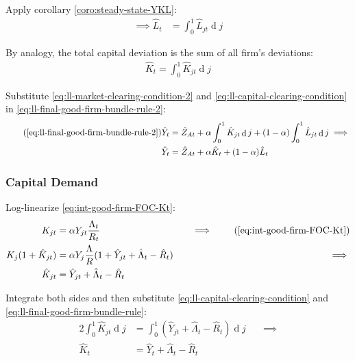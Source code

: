 \documentclass[
	12pt, 
	]{article}
\numberwithin{equation}{section}
\DeclareMathOperator{\dif}{d}
\theoremstyle{definition}
\theoremstyle{plain}
\theoremstyle{plain}
\theoremstyle{plain}
\begin{document}
Apply corollary \ref{coro:steady-state-YKL}:
\begin{align}
	\implies \hat{L}_t &= \int_{0}^{1} \hat{L}_{jt} \dif j \label{eq:ll-market-clearing-condition-2}
\end{align}

By analogy, the total capital deviation is the sum of all firm's deviations:
\begin{align}
	\hat{K}_t = \int_{0}^{1} \hat{K}_{jt} \dif j \label{eq:ll-capital-clearing-condition}
\end{align}

Substitute \ref{eq:ll-market-clearing-condition-2} and \ref{eq:ll-capital-clearing-condition} in \ref{eq:ll-final-good-firm-bundle-rule-2}:
\begin{align}
\tag{\ref{eq:ll-final-good-firm-bundle-rule-2}}
	\hat{Y}_t &= \hat{Z}_{At} + \alpha \int_{0}^{1} \hat{K}_{jt} \dif j + (1-\alpha) \int_{0}^{1} \hat{L}_{jt} \dif j \implies \\
	\hat{Y}_t &= \hat{Z}_{At} + \alpha \hat{K}_t + (1-\alpha) \hat{L}_t \label{eq:ll-final-good-firm-bundle-rule-3}
\end{align}


\subsubsection{Capital Demand}

Log-linearize \ref{eq:int-good-firm-FOC-Kt}:
\begin{alignat}{2}
	K_{jt} &= \alpha Y_{jt} \frac{\Lambda_t}{R_t} &\implies \tag{\ref{eq:int-good-firm-FOC-Kt}} \\
	K_j (1+ \hat{K}_{jt}) &= \alpha Y_{j} \frac{\Lambda}{R} (1+ \hat{Y}_{jt} + \hat{\Lambda}_t - \hat{R}_t) \quad &\implies \nonumber \\
	\hat{K}_{jt} &= \hat{Y}_{jt} + \hat{\Lambda}_t - \hat{R}_t \nonumber
\end{alignat}

Integrate both sides and then substitute \ref{eq:ll-capital-clearing-condition} and \ref{eq:ll-final-good-firm-bundle-rule}:
\begin{alignat}{2}
	\int_{0}^{1} \hat{K}_{jt} \dif j &= \int_{0}^{1} \left( \hat{Y}_{jt} + \hat{\Lambda}_t - \hat{R}_t \right) \dif j \quad &\implies \nonumber \\
	\hat{K}_t &= \hat{Y}_t + \hat{\Lambda}_t - \hat{R}_t \label{eq:ll-int-good-firm-FOC-Kt}
\end{alignat}
\end{document}
